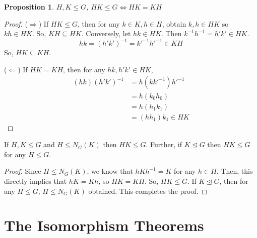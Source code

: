 \documentclass[12pt, a4paper, openany, twoside]{book}
\newtheorem{prop}[thm]{Proposition}
\theoremstyle{definition}
\theoremstyle{remark}
\theoremstyle{plain}
\numberwithin{equation}{section}
\begin{document}
\begin{prop}
    
$H, K \leq G$, $HK \leq G \iff HK = KH$

\end{prop}

\begin{proof}
    
($\Rightarrow$) If $HK \leq G$, then for any $k \in K, h \in H$, obtain $k, h \in HK$ so $kh \in HK$. 
So, $KH \subseteq HK$. Conversely, let $hk \in HK$. Then $k^{-1}h^{-1} = h'k' \in HK$. 
\[hk = (h'k')^{-1} = k'^{-1}h'^{-1} \in KH\]
So, $HK \subseteq KH$.

($\Leftarrow$) If $HK = KH$, then for any $hk, h'k' \in HK$, 
\begin{align*}
    (hk)(h'k')^{-1} &= h(kk'^{-1})h'^{-1} \\
    & = h (k_0 h_0) \\
    &= h (h_1 k_1) \\
    & = (h h_1) k_1 \in HK
\end{align*}

\end{proof}

\begin{tcolorbox}[colback=yellow!10!white,colframe=green!75!black,title=Corollary 15(For Second Isomorphism Theorem)]

If $H, K \leq G$ and $H \leq N_G(K)$ then $HK \leq G$. Further, if $K \trianglelefteq G$ then $HK \leq G$ for any $H \leq G$. 

\end{tcolorbox}

\begin{proof}
    
Since $H \leq N_G(K)$, we know that $hKh^{-1} = K$ for any $h \in H$. 
Then, this directly implies that $hK = Kh$, so $HK = KH$. So, $HK \leq G$. If $K \trianglelefteq G$, then for any $H \leq G$, $H \leq N_G(K)$ obtained. This completes the proof.

\end{proof}

\begin{tcolorbox}[colback=yellow!10!white,colframe=violet!75!white,title=Exercise Sec 3.2.]
\end{tcolorbox}

\newpage 

\section{The Isomorphism Theorems}
\end{document}
